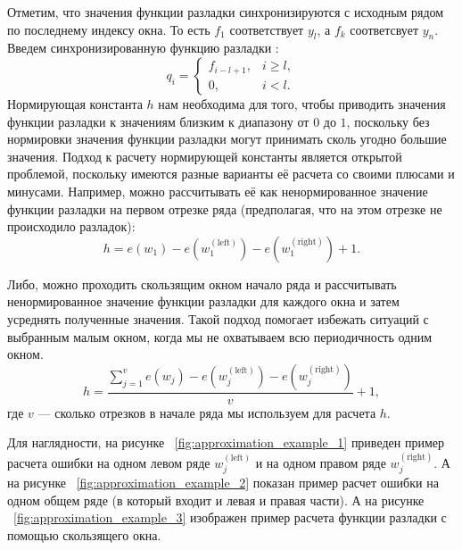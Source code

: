 \documentclass[%
12pt,
master,  %
natbib,      %
subf,        %
substylefile = spbu.rtx,
href,        %
colorlinks,  %
]{disser}
\begin{document}
Отметим, что значения функции разладки синхронизируются с исходным рядом по последнему индексу окна. То есть $f_1$ соответствует $y_l$, а $f_k $ соответсвует $y_n$. Введем синхронизированную функцию разладки :
\begin{equation*}
q_i =
	\begin{cases}
		f_{i-l+1}, & i \geq l, \\
		0, & i < l.
	\end{cases}
\end{equation*}
Нормирующая константа $h$ нам необходима для того, чтобы приводить значения функции разладки к значениям близким к диапазону от $0$ до $1$, поскольку без нормировки значения функции разладки могут принимать сколь угодно большие значения. Подход к расчету нормирующей константы является открытой проблемой, поскольку имеются разные варианты её расчета со своими плюсами и минусами.
Например, можно рассчитывать её как ненормированное значение функции разладки на первом отрезке ряда (предполагая, что на этом отрезке не происходило разладок):
\begin{equation*} 
h = e(w_1) - e(w_1^{\mathrm{(left)}}) - e(w_1^{\mathrm{(right)}}) + 1. 
\end{equation*}

Либо, можно проходить скользящим окном начало ряда и рассчитывать ненормированное значение функции разладки для каждого окна и затем усреднять полученные значения. Такой подход помогает избежать ситуаций с выбранным малым окном, когда мы не охватываем всю периодичность одним окном.
\begin{equation*} 
h = \frac{\sum_{j=1}^{v}e(w_j) - e(w_j^{\mathrm{(left)}}) - e(w_j^{\mathrm{(right)}})}{v} + 1, 
\end{equation*}
где $v$ --- сколько отрезков в начале ряда мы используем для расчета $h$.


Для наглядности, на рисунке ~\ref{fig:approximation_example_1} приведен пример расчета ошибки на одном левом ряде $ w_j^{\mathrm{(left)}} $ и на одном правом ряде $ w_j^{\mathrm{(right)}} $. А на рисунке ~\ref{fig:approximation_example_2} показан пример расчет ошибки на одном общем ряде (в который входит и левая и правая части). А на рисунке ~\ref{fig:approximation_example_3} изображен пример расчета функции разладки с помощью скользящего окна.
\end{document}
